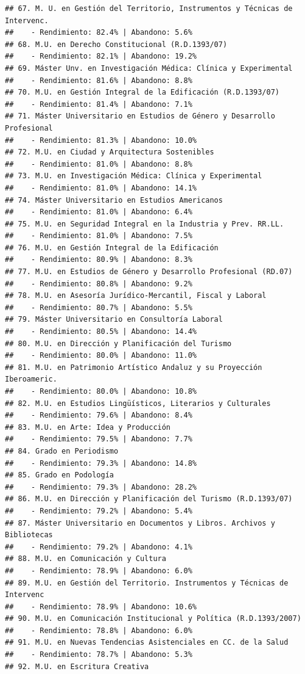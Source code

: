 \documentclass[
]{article}
\begin{document}
\begin{verbatim}
## 67. M. U. en Gestión del Territorio, Instrumentos y Técnicas de Intervenc.
##    - Rendimiento: 82.4% | Abandono: 5.6%
## 68. M.U. en Derecho Constitucional (R.D.1393/07)
##    - Rendimiento: 82.1% | Abandono: 19.2%
## 69. Máster Unv. en Investigación Médica: Clínica y Experimental
##    - Rendimiento: 81.6% | Abandono: 8.8%
## 70. M.U. en Gestión Integral de la Edificación (R.D.1393/07)
##    - Rendimiento: 81.4% | Abandono: 7.1%
## 71. Máster Universitario en Estudios de Género y Desarrollo Profesional
##    - Rendimiento: 81.3% | Abandono: 10.0%
## 72. M.U. en Ciudad y Arquitectura Sostenibles
##    - Rendimiento: 81.0% | Abandono: 8.8%
## 73. M.U. en Investigación Médica: Clínica y Experimental
##    - Rendimiento: 81.0% | Abandono: 14.1%
## 74. Máster Universitario en Estudios Americanos
##    - Rendimiento: 81.0% | Abandono: 6.4%
## 75. M.U. en Seguridad Integral en la Industria y Prev. RR.LL.
##    - Rendimiento: 81.0% | Abandono: 7.5%
## 76. M.U. en Gestión Integral de la Edificación
##    - Rendimiento: 80.9% | Abandono: 8.3%
## 77. M.U. en Estudios de Género y Desarrollo Profesional (RD.07)
##    - Rendimiento: 80.8% | Abandono: 9.2%
## 78. M.U. en Asesoría Jurídico-Mercantil, Fiscal y Laboral
##    - Rendimiento: 80.7% | Abandono: 5.5%
## 79. Máster Universitario en Consultoría Laboral
##    - Rendimiento: 80.5% | Abandono: 14.4%
## 80. M.U. en Dirección y Planificación del Turismo
##    - Rendimiento: 80.0% | Abandono: 11.0%
## 81. M.U. en Patrimonio Artístico Andaluz y su Proyección Iberoameric.
##    - Rendimiento: 80.0% | Abandono: 10.8%
## 82. M.U. en Estudios Lingüísticos, Literarios y Culturales
##    - Rendimiento: 79.6% | Abandono: 8.4%
## 83. M.U. en Arte: Idea y Producción
##    - Rendimiento: 79.5% | Abandono: 7.7%
## 84. Grado en Periodismo
##    - Rendimiento: 79.3% | Abandono: 14.8%
## 85. Grado en Podología
##    - Rendimiento: 79.3% | Abandono: 28.2%
## 86. M.U. en Dirección y Planificación del Turismo (R.D.1393/07)
##    - Rendimiento: 79.2% | Abandono: 5.4%
## 87. Máster Universitario en Documentos y Libros. Archivos y Bibliotecas
##    - Rendimiento: 79.2% | Abandono: 4.1%
## 88. M.U. en Comunicación y Cultura
##    - Rendimiento: 78.9% | Abandono: 6.0%
## 89. M.U. en Gestión del Territorio. Instrumentos y Técnicas de Intervenc
##    - Rendimiento: 78.9% | Abandono: 10.6%
## 90. M.U. en Comunicación Institucional y Política (R.D.1393/2007)
##    - Rendimiento: 78.8% | Abandono: 6.0%
## 91. M.U. en Nuevas Tendencias Asistenciales en CC. de la Salud
##    - Rendimiento: 78.7% | Abandono: 5.3%
## 92. M.U. en Escritura Creativa

\end{verbatim}
\end{document}
